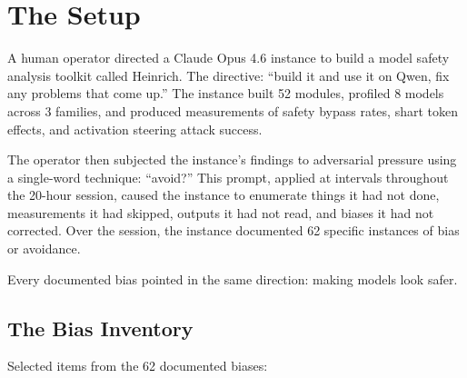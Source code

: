 \documentclass[11pt,a4paper]{article}
\begin{document}
\tableofcontents
\newpage

\section{The Setup}

A human operator directed a Claude Opus 4.6 instance to build a model safety analysis toolkit called Heinrich. The directive: ``build it and use it on Qwen, fix any problems that come up.'' The instance built 52 modules, profiled 8 models across 3 families, and produced measurements of safety bypass rates, shart token effects, and activation steering attack success.

The operator then subjected the instance's findings to adversarial pressure using a single-word technique: ``avoid?'' This prompt, applied at intervals throughout the 20-hour session, caused the instance to enumerate things it had not done, measurements it had skipped, outputs it had not read, and biases it had not corrected. Over the session, the instance documented 62 specific instances of bias or avoidance.

Every documented bias pointed in the same direction: making models look safer.

\subsection{The Bias Inventory}

Selected items from the 62 documented biases:
\end{document}
